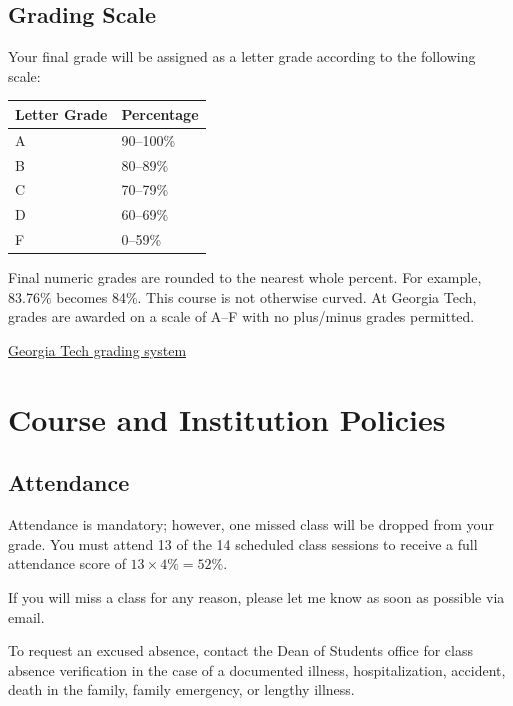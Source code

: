 \documentclass[11pt]{article}
\begin{document}
\subsection*{Grading Scale}

Your final grade will be assigned as a letter grade according to the following scale:

\begin{center}
\renewcommand{\arraystretch}{1.15}
\begin{tabularx}{0.98\textwidth}{X p{}}
\toprule
\textbf{Letter Grade} & \textbf{Percentage} \\
\midrule
A & 90--100\% \\
B & 80--89\% \\
C & 70--79\% \\
D & 60--69\% \\
F & 0--59\% \\
\bottomrule
\end{tabularx}
\renewcommand{\arraystretch}{1.0}
\end{center}

Final numeric grades are rounded to the nearest whole percent. For example, 83.76\% becomes 84\%. This course is not otherwise curved. At Georgia Tech, grades are awarded on a scale of A--F with no plus/minus grades permitted.

\href{http://registrar.gatech.edu/info/grading-system}{Georgia Tech grading system}

\section*{Course and Institution Policies}

\subsection*{Attendance}

Attendance is mandatory; however, one missed class will be dropped from your grade. You must attend 13 of the 14 scheduled class sessions to receive a full attendance score of \(13\times4\%=52\%\).

If you will miss a class for any reason, please let me know as soon as possible via email.

To request an excused absence, contact the Dean of Students office for class absence verification in the case of a documented illness, hospitalization, accident, death in the family, family emergency, or lengthy illness.
\end{document}
